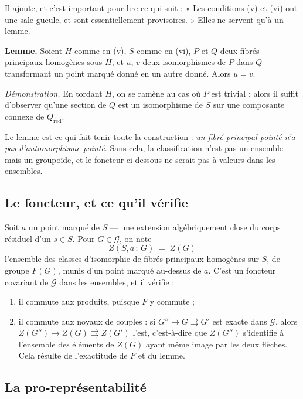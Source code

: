 \documentclass[11pt,a4paper]{article}
\begin{document}
Il ajoute, et c'est important pour lire ce qui suit : « Les conditions (v) et
(vi) ont une sale gueule, et sont essentiellement provisoires. » Elles ne
servent qu'à un lemme.

\textbf{Lemme.} Soient $H$ comme en (v), $S$ comme en (vi), $P$ et $Q$ deux
fibrés principaux homogènes sous $H$, et $u$, $v$ deux isomorphismes de $P$
dans $Q$ transformant un point marqué donné en un autre donné. Alors $u = v$.

\emph{Démonstration.} En tordant $H$, on se ramène au cas où $P$ est trivial ;
alors il suffit d'observer qu'une section de $Q$ est un isomorphisme de $S$ sur
une composante connexe de $Q_{\mathrm{r\acute{e}d}}$.

Le lemme est ce qui fait tenir toute la construction : \emph{un fibré
principal pointé n'a pas d'automorphisme pointé}. Sans cela, la classification
n'est pas un ensemble mais un groupoïde, et le foncteur ci-dessous ne serait
pas à valeurs dans les ensembles.

\subsection*{Le foncteur, et ce qu'il vérifie}

Soit $a$ un point marqué de $S$ --- une extension algébriquement close du corps
résiduel d'un $s \in S$. Pour $G \in \mathcal{G}$, on note
\[
  Z(S, a\,;\, G) \;=\; Z(G)
\]
l'ensemble des classes d'isomorphie de fibrés principaux homogènes sur $S$, de
groupe $F(G)$, munis d'un point marqué au-dessus de $a$. C'est un foncteur
covariant de $\mathcal{G}$ dans les ensembles, et il vérifie :

\begin{enumerate}
  \item[1)] il commute aux produits, puisque $F$ y commute ;
  \item[2)] il commute aux noyaux de couples : si
    $G'' \to G \rightrightarrows G'$ est exacte dans $\mathcal{G}$, alors
    $Z(G'') \to Z(G) \rightrightarrows Z(G')$ l'est, c'est-à-dire que $Z(G'')$
    s'identifie à l'ensemble des éléments de $Z(G)$ ayant même image par les
    deux flèches. Cela résulte de l'exactitude de $F$ et du lemme.
\end{enumerate}

\subsection*{La pro-représentabilité}
\end{document}
